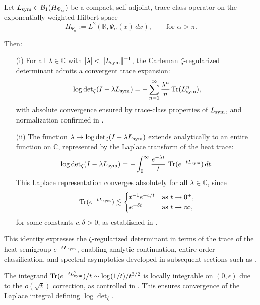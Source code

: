 \begin{lemma}
\label{lem:det_via_heat_trace}
Let \( L_{\mathrm{sym}} \in \mathcal{B}_1(H_{\Psi_\alpha}) \) be a compact, self-adjoint, trace-class operator on the exponentially weighted Hilbert space
\[
H_{\Psi_\alpha} := L^2(\mathbb{R}, \Psi_\alpha(x)\, dx), \qquad \text{for } \alpha > \pi.
\]

Then:
\begin{enumerate}
  \item[\textnormal{(i)}] For all \( \lambda \in \mathbb{C} \) with \( |\lambda| < \| L_{\mathrm{sym}} \|^{-1} \), the Carleman \(\zeta\)-regularized determinant admits a convergent trace expansion:
  \[
  \log \det\nolimits_{\zeta}(I - \lambda L_{\mathrm{sym}})
  = - \sum_{n=1}^\infty \frac{\lambda^n}{n} \operatorname{Tr}(L_{\mathrm{sym}}^n),
  \]
  with absolute convergence ensured by trace-class properties of \( L_{\mathrm{sym}} \), and normalization confirmed in .

  \item[\textnormal{(ii)}] The function \( \lambda \mapsto \log \det\nolimits_{\zeta}(I - \lambda L_{\mathrm{sym}}) \) extends analytically to an entire function on \( \mathbb{C} \), represented by the Laplace transform of the heat trace:
  \[
  \log \det\nolimits_{\zeta}(I - \lambda L_{\mathrm{sym}})
  = - \int_0^\infty \frac{e^{-\lambda t}}{t} \, \operatorname{Tr}(e^{-t L_{\mathrm{sym}}}) \, dt.
  \]
  This Laplace representation converges absolutely for all \( \lambda \in \mathbb{C} \), since
  \[
  \operatorname{Tr}(e^{-t L_{\mathrm{sym}}}) \lesssim
  \begin{cases}
    t^{-1} e^{-c/t} & \text{as } t \to 0^+, \\
    e^{-\delta t}   & \text{as } t \to \infty,
  \end{cases}
  \]
  for some constants \( c, \delta > 0 \), as established in .
\end{enumerate}

\medskip
\noindent
This identity expresses the \(\zeta\)-regularized determinant in terms of the trace of the heat semigroup \( e^{-t L_{\mathrm{sym}}} \), enabling analytic continuation, entire order classification, and spectral asymptotics developed in subsequent sections such as .
\end{lemma}

\begin{remark}
The integrand \( \operatorname{Tr}(e^{-tL_{\mathrm{sym}}^2}) / t \sim \log(1/t)/t^{3/2} \) is locally integrable on \( (0,\epsilon) \) due to the \( o(\sqrt{t}) \) correction, as controlled in . This ensures convergence of the Laplace integral defining \( \log \det_\zeta \).
\end{remark}
